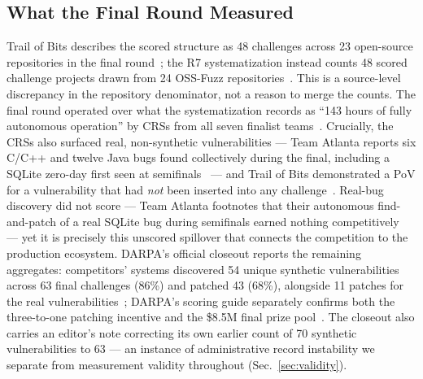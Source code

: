 \documentclass[conference,compsoc]{IEEEtran}
\begin{document}
\subsection{What the Final Round Measured}
Trail of Bits describes the scored structure as 48 challenges across 23 open-source
repositories in the final round~\cite{tobbuttercup2025}; the R7 systematization instead counts
48 scored challenge projects drawn from 24 OSS-Fuzz repositories~\cite{r7sokaixcc2026}. This is
a source-level discrepancy in the repository denominator, not a reason to merge the counts. The
final round operated over what the
systematization records as ``143 hours of fully autonomous operation'' by CRSs from
all seven finalist teams~\cite{r7sokaixcc2026}. Crucially, the CRSs also surfaced real,
non-synthetic vulnerabilities --- Team Atlanta reports six C/C++ and twelve Java bugs found
collectively during the final, including a SQLite zero-day first seen at
semifinals~\cite{taafc2025} --- and Trail of Bits demonstrated a PoV for a vulnerability that
had \emph{not} been inserted into any challenge~\cite{tobbuttercup2025}. Real-bug discovery did
not score --- Team Atlanta footnotes that their autonomous find-and-patch of a real SQLite bug
during semifinals earned nothing competitively~\cite{taasc2024} --- yet it is precisely this
unscored spillover that connects the competition to the production ecosystem. DARPA's official
closeout reports the remaining aggregates: competitors' systems discovered 54 unique synthetic
vulnerabilities across 63 final challenges (86\%) and patched 43 (68\%), alongside 11 patches for the real
vulnerabilities~\cite{darparesults2025}; DARPA's scoring guide separately confirms both the
three-to-one patching incentive and the \$8.5M final prize pool~\cite{darpascoring2025}. The
closeout also carries an editor's note correcting its own earlier count of 70 synthetic
vulnerabilities to 63 --- an instance of administrative record instability we separate from
measurement validity throughout (Sec.~\ref{sec:validity}).
\end{document}
